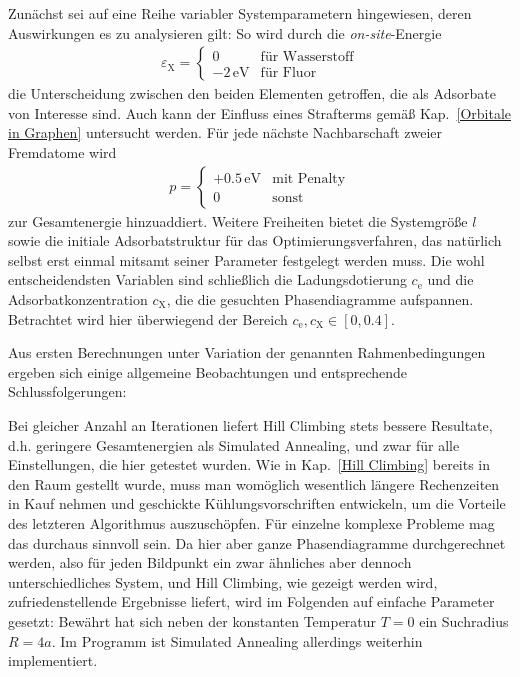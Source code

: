 \documentclass[a4paper, 10pt, twoside, openany]{book} %
\def \eX {\varepsilon_\mathrm{X}}
\def \cE {c_\mathrm{e}}
\def \cX {c_\mathrm{X}}
\begin{document}
Zunächst sei auf eine Reihe variabler Systemparametern hingewiesen, deren Auswirkungen es zu analysieren gilt: So wird durch die \emph{on-site}-Energie
%
\begin{align*}
    \eX = \begin{cases} 0 & \text{für Wasserstoff} \\ -2\,\mathrm{eV} & \text{für Fluor} \end{cases}
\end{align*}
%
die Unterscheidung zwischen den beiden Elementen getroffen, die als Adsorbate von Interesse sind. Auch kann der Einfluss eines Strafterms gemäß Kap.~\ref{Orbitale in Graphen} untersucht werden. Für jede nächste Nachbarschaft zweier Fremdatome wird
%
\begin{align*}
    p = \begin{cases} +0.5\,\mathrm{eV} & \text{mit Penalty} \\ 0 & \text{sonst} \end{cases}
\end{align*}
%
zur Gesamtenergie hinzuaddiert. Weitere Freiheiten bietet die Systemgröße $l$ sowie die initiale Adsorbatstruktur für das Optimierungsverfahren, das natürlich selbst erst einmal mitsamt seiner Parameter festgelegt werden muss. Die wohl entscheidendsten Variablen sind schließlich die Ladungsdotierung $\cE$ und die Adsorbatkonzentration $\cX$, die die gesuchten Phasendiagramme aufspannen. Betrachtet wird hier überwiegend der Bereich $\cE, \cX \in [0, 0.4]$.

Aus ersten Berechnungen unter Variation der genannten Rahmenbedingungen ergeben sich einige allgemeine Beobachtungen und entsprechende Schlussfolgerungen:

Bei gleicher Anzahl an Iterationen liefert Hill Climbing stets bessere Resultate, d.h. geringere Gesamtenergien als Simulated Annealing, und zwar für alle Einstellungen, die hier getestet wurden. Wie in Kap.~\ref{Hill Climbing} bereits in den Raum gestellt wurde, muss man womöglich wesentlich längere Rechenzeiten in Kauf nehmen und geschickte Kühlungsvorschriften entwickeln, um die Vorteile des letzteren Algorithmus auszuschöpfen. Für einzelne komplexe Probleme mag das durchaus sinnvoll sein. Da hier aber ganze Phasendiagramme durchgerechnet werden, also für jeden Bildpunkt ein zwar ähnliches aber dennoch unterschiedliches System, und Hill Climbing, wie gezeigt werden wird, zufriedenstellende Ergebnisse liefert, wird im Folgenden auf einfache Parameter gesetzt: Bewährt hat sich neben der konstanten Temperatur $T = 0$ ein Suchradius $R = 4 a$. Im Programm ist Simulated Annealing allerdings weiterhin implementiert.
\end{document}
